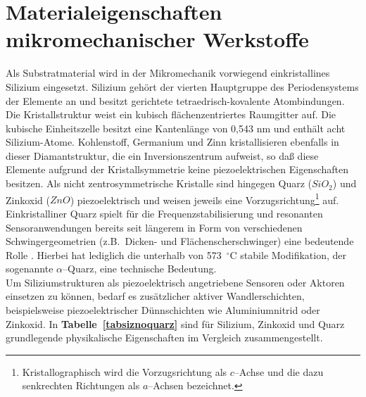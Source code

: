 \section[Materialeigenschaften]
{Materialeigenschaften mikromechanischer Werkstoffe}
\label{materialeigenschaften}

Als Substratmaterial wird in der Mikromechanik vorwiegend
einkristallines Silizium eingesetzt.  Silizium gehört der vierten
Hauptgruppe
des Periodensystems der Elemente an und besitzt gerichtete
tetraedrisch-kovalente Atombindungen.  Die Kristallstruktur weist ein
kubisch flächenzentriertes Raumgitter auf.  Die kubische Einheitszelle
besitzt eine Kantenlänge von 0,543 nm und enthält acht Silizium-Atome.
Kohlenstoff, Germanium und Zinn kristallisieren ebenfalls in dieser
Diamantstruktur, die ein Inversionszentrum aufweist, so daß diese Elemente
aufgrund der Kristallsymmetrie keine piezoelektrischen Eigenschaften
besitzen.
Als nicht zentrosymmetrische Kristalle sind hingegen Quarz ($SiO_{2}$)
und Zinkoxid ($ZnO$) piezoelektrisch und weisen jeweils eine
Vorzugsrichtung\footnote{Kristallographisch wird die Vorzugsrichtung
als $c$--Achse und die dazu senkrechten Richtungen als $a$--Achsen
bezeichnet.} auf. Einkristalliner Quarz spielt für die
Frequenzstabilisierung und resonanten Sensoranwendungen bereits seit
längerem in Form von verschiedenen Schwingergeometrien (z.B.\ Dicken-
und Flächenscherschwinger) eine bedeutende Rolle \cite{Bue91b}. Hierbei hat
lediglich die unterhalb von 573~$^\circ$C stabile Modifikation, der
sogenannte $ \alpha $--Quarz, eine technische Bedeutung.\\
%
Um Siliziumstrukturen als piezoelektrisch angetriebene Sensoren oder
Aktoren einsetzen zu können, bedarf es zusätzlicher aktiver Wandlerschichten,
beispielsweise piezoelektrischer Dünnschichten wie Aluminiumnitrid oder
Zinkoxid. In {\bf Tabelle~\ref{tabsiznoquarz}} sind für Silizium, Zinkoxid
und Quarz grundlegende physikalische Eigenschaften im Vergleich
zusammengestellt.
